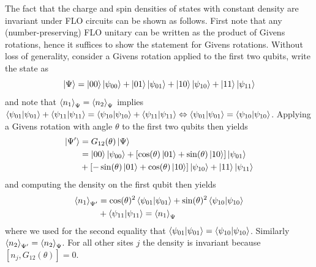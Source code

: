 \documentclass[aps,prb,twoside,superscriptaddress,longbibliography,nofootinbib,floatfix, notitlepage,twocolumn]{revtex4-1}
\begin{document}
{The fact that the charge and spin densities of states with constant density are invariant under FLO 
circuits can be shown as follows. First note that any (number-preserving) FLO unitary can be written as the 
product of Givens rotations, hence it suffices to show the statement for Givens rotations.
Without loss of generality, consider a Givens rotation applied to the first two qubits, write the state as 
\begin{equation}
    \ket{\Psi} = \ket{00} \ket{\psi_{00}} + \ket{01} \ket{\psi_{01}}
               + \ket{10} \ket{\psi_{10}} + \ket{11} \ket{\psi_{11}}
\end{equation}
and note that $\braket{n_1}_\Psi = \braket{n_2}_\Psi$ implies
$\braket{\psi_{01}|\psi_{01}} + \braket{\psi_{11}|\psi_{11}} = \braket{\psi_{10}|\psi_{10}} + \braket{\psi_{11}|\psi_{11}} \Leftrightarrow \braket{\psi_{01}|\psi_{01}} = \braket{\psi_{10}|\psi_{10}}$.
Applying a Givens rotation with angle $\theta$ to the first two qubits then yields
\begin{equation}
\begin{aligned}
    \ket{\Psi'} &= G_{12}(\theta) \ket{\Psi} \\
                &= \ket{00} \ket{\psi_{00}}
                + [\cos(\theta) \ket{01} + \sin(\theta) \ket{10}] \ket{\psi_{01}} \\
                &+ [-\sin(\theta) \ket{01} + \cos(\theta) \ket{10}] \ket{\psi_{10}}
                + \ket{11} \ket{\psi_{11}}
\end{aligned}
\end{equation}
and computing  the density on the first qubit then yields
\begin{equation}
\begin{aligned}
    \braket{n_1}_{\Psi'} &= \cos(\theta)^2 \braket{\psi_{01}|\psi_{01}} 
                       + \sin(\theta)^2 \braket{\psi_{10}|\psi_{10}} \\
                       &+ \braket{\psi_{11}|\psi_{11}}
                       = \braket{n_1}_\Psi
\end{aligned}
\end{equation}
where we used for the second equality that
$\braket{\psi_{01}|\psi_{01}} = \braket{\psi_{10}|\psi_{10}}$.
Similarly $\braket{n_2}_{\Psi'} = \braket{n_2}_\Psi$. For all other sites $j$ the density is invariant because $[n_j, G_{12}(\theta)] = 0$.



}
\end{document}
